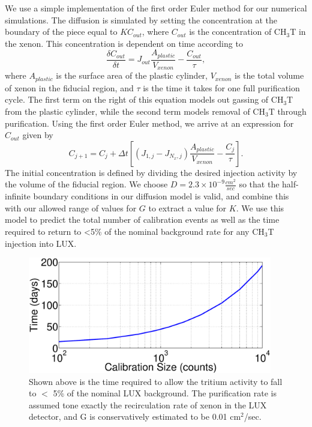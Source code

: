 We use a simple implementation of the first order Euler method for our numerical simulations. The diffusion is simulated by setting the concentration at the boundary of the piece equal to $KC_{out}$, where $C_{out}$ is the concentration of CH$_3$T in the xenon.  This concentration is dependent on time according to
\[\frac{\delta C_{out}}{\delta t} = J_{out} \frac{A_{plastic}}{V_{xenon}}-\frac{C_{out}}{\tau},\]
where $A_{plastic}$ is the surface area of the plastic cylinder, $V_{xenon}$ is the total volume of xenon in the fiducial region, and $\tau$ is the time it takes for one full purification cycle.  The first term on the right of this equation models out gassing of CH$_3$T from the plastic cylinder, while the second term models removal of CH$_3$T through purification.  Using the first order Euler method, we arrive at an expression for $C_{out}$ given by
\[C_{j+1}=C_j + \Delta t \left[(J_{1,j}-J_{N_x,j})\frac{A_{plastic}}{V_{xenon}}-\frac{C_j}{\tau}\right].\]
The initial concentration is defined by dividing the desired injection activity by the volume of the fiducial region.  We choose $D = 2.3 \times 10^{-9} \frac {cm^2}{sec}$ so that the half-infinite boundary conditions in our diffusion model is valid, and combine this with our allowed range of values for $G$ to extract a value for $K$.  We use this model to predict the total number of calibration events as well as the time required to return to \textless 5\% of the nominal background rate for any CH$_3$T injection into LUX.  

\begin{figure}[h!]
\centering
\includegraphics[width=0.95\textwidth]{Calibration_length.eps}
\caption{Shown above is the time required to allow the tritium activity to fall to $<$ 5\% of the nominal LUX background. The purification rate is assumed tone exactly the recirculation rate of xenon in the LUX detector, and G is conservatively estimated to be 0.01 cm$^2$/sec.}
\label{fig:cal_time}
\end{figure}

